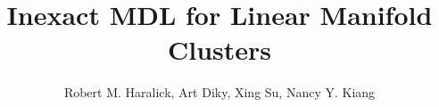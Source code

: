 \documentclass[12pt]{article}
\title{\Large \bf Inexact MDL for Linear Manifold Clusters}
\author{Robert M. Haralick, Art Diky, Xing Su, Nancy Y. Kiang}
\makeatletter
\newif \ifIEEEtran \@ifclassloaded{IEEEtran} {\IEEEtrantrue} {\IEEEtranfalse}
\makeatother
\begin{document}
\maketitle
\tableofcontents
\ifIEEEtran
\else


\fi





\newpage
\begin{appendices}
\renewcommand{\thesubsection}{\Alph{subsection}}
\newpage
\end{appendices}
\end{document}

